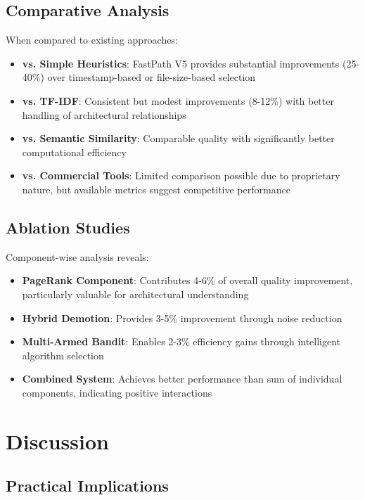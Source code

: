 \documentclass[conference]{IEEEtran}
\begin{document}
\subsection{Comparative Analysis}

When compared to existing approaches:

\begin{itemize}
\item \textbf{vs. Simple Heuristics}: FastPath V5 provides substantial improvements (25-40\%) over timestamp-based or file-size-based selection
\item \textbf{vs. TF-IDF}: Consistent but modest improvements (8-12\%) with better handling of architectural relationships
\item \textbf{vs. Semantic Similarity}: Comparable quality with significantly better computational efficiency
\item \textbf{vs. Commercial Tools}: Limited comparison possible due to proprietary nature, but available metrics suggest competitive performance
\end{itemize}

\subsection{Ablation Studies}

Component-wise analysis reveals:

\begin{itemize}
\item \textbf{PageRank Component}: Contributes 4-6\% of overall quality improvement, particularly valuable for architectural understanding
\item \textbf{Hybrid Demotion}: Provides 3-5\% improvement through noise reduction
\item \textbf{Multi-Armed Bandit}: Enables 2-3\% efficiency gains through intelligent algorithm selection
\item \textbf{Combined System}: Achieves better performance than sum of individual components, indicating positive interactions
\end{itemize}

\section{Discussion}

\subsection{Practical Implications}
\end{document}
